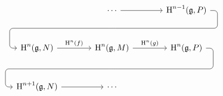 \begin{proposition}
\begin{enumerate}
			\[
				\begin{tikzcd}[column sep = large]
					{}
					&
					\dotsb
					\arrow{r}
					\arrow[d, phantom, ""{coordinate, name=Y}]
					&
					\Homology^{n-1}(\glie, P)
					\arrow[ dll,
						rounded corners,
						to path={ -- ([xshift=2ex]\tikztostart.east)
											|- (Y)
											-| ([xshift=-2ex]\tikztotarget.west)
											-- (\tikztotarget) }
					]
					\\[1em]
					\Homology^n(\glie, N)
					\arrow{r}[above]{ \Homology^n(f) }
					&
					\Homology^n(\glie, M)
					\arrow{r}[above]{ \Homology^n(g) }
					\arrow[d, phantom, ""{coordinate, name=Z}]
					&
					\Homology^n(\glie, P)
					\arrow[ dll,
						rounded corners,
						to path={ -- ([xshift=2ex]\tikztostart.east)
											|- (Z)
											-| ([xshift=-2ex]\tikztotarget.west)
											-- (\tikztotarget) }
					]
					\\[1em]
					\Homology^{n+1}(\glie, N)
					\arrow{r}
					&
					\dotsb
					&
					{}
				\end{tikzcd}
			\]
	\end{enumerate}
\end{proposition}



